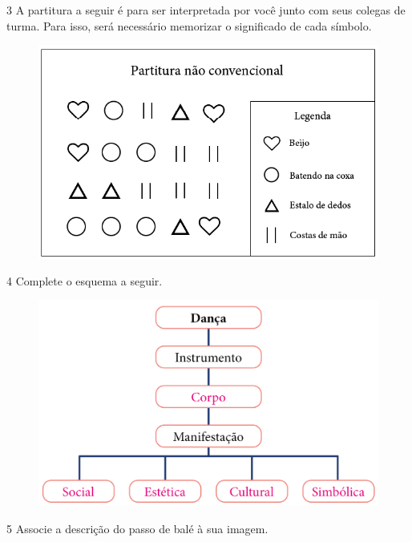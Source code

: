 \num{3}  A partitura a seguir é para ser interpretada por você junto com seus
  colegas de turma. Para isso, será necessário memorizar o significado
  de cada símbolo.

\begin{figure}[htpb!]
\centering
\includegraphics[width=\textwidth]{../ilustracoes/ART5/SAEB_5ANO_ART_FIGURA11.png}
\end{figure}


\pagebreak
\num{4}  Complete o esquema a seguir.

\begin{figure}[htpb!]
\includegraphics[width=\textwidth]{../ilustracoes/ART5/SAEB_5ANO_ART_FIGURA12.png}
\end{figure}


\num{5}  Associe a descrição do passo de balé à sua imagem.


